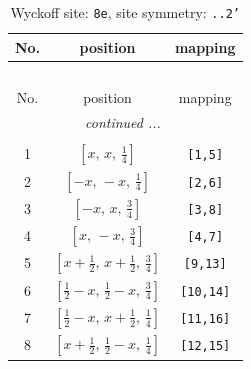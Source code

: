 \documentclass[fleqn,8pt]{jsarticle}
\begin{document}
\renewcommand{\arraystretch}{1.2}
\begin{longtable}{ccc}
\caption{Wyckoff site: {\tt 8e}, site symmetry: {\tt ..2'}}
 \\
 \hline \hline
No. & position & mapping \\ \hline \endfirsthead

\multicolumn{2}{l}{\tablename\ \thetable{}} \\
 \hline \hline
No. & position & mapping \\ \hline \endhead

 \hline \hline
\multicolumn{2}{r}{\footnotesize\it continued ...} \\ \endfoot

 \hline \hline
\multicolumn{2}{r}{} \\ \endlastfoot

1 & $\left[ x,\, x,\, \frac{1}{4} \right]$ & {\tt [1,5]} \\ \hline
2 & $\left[ - x,\, - x,\, \frac{1}{4} \right]$ & {\tt [2,6]} \\ \hline
3 & $\left[ - x,\, x,\, \frac{3}{4} \right]$ & {\tt [3,8]} \\ \hline
4 & $\left[ x,\, - x,\, \frac{3}{4} \right]$ & {\tt [4,7]} \\ \hline
5 & $\left[ x + \frac{1}{2},\, x + \frac{1}{2},\, \frac{3}{4} \right]$ & {\tt [9,13]} \\ \hline
6 & $\left[ \frac{1}{2} - x,\, \frac{1}{2} - x,\, \frac{3}{4} \right]$ & {\tt [10,14]} \\ \hline
7 & $\left[ \frac{1}{2} - x,\, x + \frac{1}{2},\, \frac{1}{4} \right]$ & {\tt [11,16]} \\ \hline
8 & $\left[ x + \frac{1}{2},\, \frac{1}{2} - x,\, \frac{1}{4} \right]$ & {\tt [12,15]} \\
\end{longtable}
\renewcommand{\arraystretch}{1.2}
\end{document}
